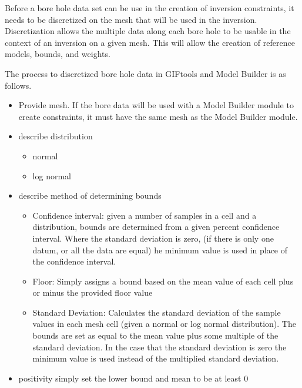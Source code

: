 Before a bore hole data set can be use in the creation of inversion constraints, it needs to be discretized on the mesh that will be used in the inversion. Discretization allows the multiple data along each bore hole to be usable in the context of an inversion on a given mesh. This will allow the creation of reference models, bounds, and weights. 

The process to discretized bore hole data in GIFtools and Model Builder is as follows.

\begin{itemize}
 \item Provide mesh. If the bore data will be used with a Model Builder module to create constraints, it must have the same mesh as the Model Builder module.
 \item describe distribution 
 \begin{itemize}
  \item normal
  \item log normal
 \end{itemize}
 \item describe method of determining bounds
 \begin{itemize}
  \item Confidence interval: given a number of samples in a cell and a distribution, bounds are determined from a given percent confidence interval. Where the standard deviation is zero, (if there is only one datum, or all the data are equal) he minimum value is used in place of the confidence interval.
  \item Floor: Simply assigns a bound based on the mean value of each cell plus or minus the provided floor value
  \item Standard Deviation: Calculates the standard deviation of the sample values in each mesh cell (given a normal or log normal distribution). The bounds are set as equal to the mean value plus some multiple of the standard deviation. In the case that the standard deviation is zero the minimum value is used instead of the multiplied standard deviation. 
 \end{itemize}
 \item positivity simply set the lower bound and mean to be at least 0
\end{itemize}

